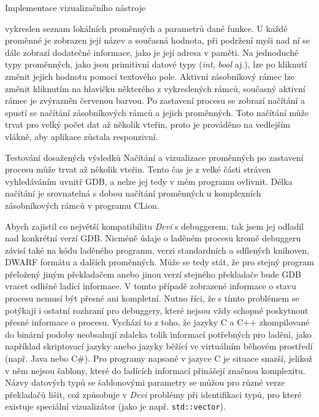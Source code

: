 \documentclass[bc,male,python,dept460]{diploma}						%
\begin{document}
\begin{section}{Implementace vizualizačního nástroje}
\begin{description}
			vykreslen seznam lokálních proměnných a parametrů dané funkce. U každé proměnné je zobrazen její název a současná hodnota, při podržení myši nad ní se dále
			zobrazí dodatečné informace, jako je její adresa v paměti. Na jednoduché typy proměnných, jako jsou primitivní datové typy (\textit{int}, \textit{bool}
			aj.), lze po kliknutí změnit jejich hodnotu pomocí textového pole. Aktivní zásobníkový rámec lze změnit kliknutím na hlavičku některého z vykreslených
			rámců, současný aktivní rámec je zvýrazněn červenou barvou. Po zastavení procesu se zobrazí načítání a spustí se načítání zásobníkových
			rámců a jejich proměnných. Toto načítání může trvat pro velký počet dat až několik vteřin, proto je prováděno na vedlejším vlákně, aby aplikace
			zůstala responzivní.
	\end{description}

\end{section}
\begin{section}{Testování dosažených výsledků}
	Načítání a vizualizace proměnných po zastavení procesu může trvat až několik vteřin. Tento čas je z velké části stráven vyhledáváním uvnitř GDB,
	a nelze jej tedy v mém programu ovlivnit. Délka načítání je srovnatelná s dobou načítání proměnných u komplexních zásobníkových rámců v programu CLion.

	Abych zajistil co největší kompatibilitu \textit{Devi} s debuggerem, tak jsem jej odladil nad konkrétní verzí GDB. Nicméně údaje o laděném procesu kromě
	debuggeru závisí také na kódu laděného programu, verzi standardních a sdílených knihoven, DWARF formátu a dalších proměnných.
	Může se tedy stát, že pro stejný program přeložený jiným překladačem anebo jinou verzí stejného překladače bude GDB vracet odlišné ladící informace.
	V tomto případě zobrazené informace o stavu procesu nemusí být přesné ani kompletní. Nutno říci, že s tímto problémem
	se potýkají i ostatní rozhraní pro debuggery, které nejsou vždy schopné poskytnout přesné informace o procesu. Vychází to z toho, že jazyky C a
	C++ zkompilované do binární podoby neobsahují zdaleka tolik informací potřebných pro ladění, jako například skriptovací jazyky anebo jazyky běžící
	ve virtuálním běhovém prostředí (např. Java nebo C\#). Pro programy napsané v jazyce C je situace snazší, jelikož v něm nejsou šablony, které do ladících
	informací přinášejí značnou komplexitu. Názvy datových typů se šablonovými parametry se můžou pro různé verze překladačů lišit, což způsobuje v \textit{Devi}
	problémy při identifikaci typů, pro které existuje speciální vizualizátor (jako je např. \texttt{std::vector}).



\end{section}
\end{document}
